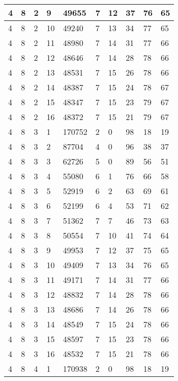\begin{table}[!ht]
\begin{tabular}{|l|l|l|l|l|l|l|l|l|l|}
        4 & 8 & 2 & 9 & 49655 & 7 & 12 & 37 & 76 & 65 \\ \hline
        4 & 8 & 2 & 10 & 49240 & 7 & 13 & 34 & 77 & 65 \\ \hline
        4 & 8 & 2 & 11 & 48980 & 7 & 14 & 31 & 77 & 66 \\ \hline
        4 & 8 & 2 & 12 & 48646 & 7 & 14 & 28 & 78 & 66 \\ \hline
        4 & 8 & 2 & 13 & 48531 & 7 & 15 & 26 & 78 & 66 \\ \hline
        4 & 8 & 2 & 14 & 48387 & 7 & 15 & 24 & 78 & 67 \\ \hline
        4 & 8 & 2 & 15 & 48347 & 7 & 15 & 23 & 79 & 67 \\ \hline
        4 & 8 & 2 & 16 & 48372 & 7 & 15 & 21 & 79 & 67 \\ \hline
        4 & 8 & 3 & 1 & 170752 & 2 & 0 & 98 & 18 & 19 \\ \hline
        4 & 8 & 3 & 2 & 87704 & 4 & 0 & 96 & 38 & 37 \\ \hline
        4 & 8 & 3 & 3 & 62726 & 5 & 0 & 89 & 56 & 51 \\ \hline
        4 & 8 & 3 & 4 & 55080 & 6 & 1 & 76 & 66 & 58 \\ \hline
        4 & 8 & 3 & 5 & 52919 & 6 & 2 & 63 & 69 & 61 \\ \hline
        4 & 8 & 3 & 6 & 52199 & 6 & 4 & 53 & 71 & 62 \\ \hline
        4 & 8 & 3 & 7 & 51362 & 7 & 7 & 46 & 73 & 63 \\ \hline
        4 & 8 & 3 & 8 & 50554 & 7 & 10 & 41 & 74 & 64 \\ \hline
        4 & 8 & 3 & 9 & 49953 & 7 & 12 & 37 & 75 & 65 \\ \hline
        4 & 8 & 3 & 10 & 49409 & 7 & 13 & 34 & 76 & 65 \\ \hline
        4 & 8 & 3 & 11 & 49171 & 7 & 14 & 31 & 77 & 66 \\ \hline
        4 & 8 & 3 & 12 & 48832 & 7 & 14 & 28 & 78 & 66 \\ \hline
        4 & 8 & 3 & 13 & 48686 & 7 & 14 & 26 & 78 & 66 \\ \hline
        4 & 8 & 3 & 14 & 48549 & 7 & 15 & 24 & 78 & 66 \\ \hline
        4 & 8 & 3 & 15 & 48597 & 7 & 15 & 23 & 78 & 66 \\ \hline
        4 & 8 & 3 & 16 & 48532 & 7 & 15 & 21 & 78 & 66 \\ \hline
        4 & 8 & 4 & 1 & 170938 & 2 & 0 & 98 & 18 & 19 \\ \hline

\end{tabular}
\end{table}
